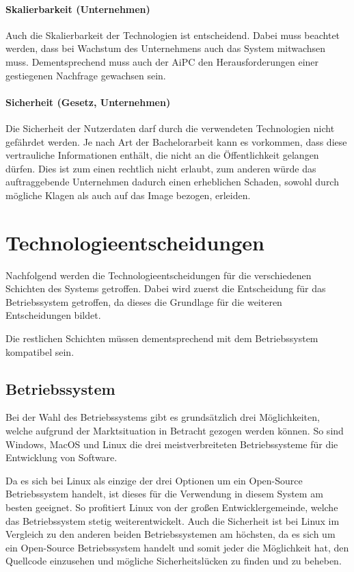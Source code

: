 \paragraph{Skalierbarkeit (Unternehmen)}\label{par:skalierbarkeit}
Auch die Skalierbarkeit der Technologien ist entscheidend.
Dabei muss beachtet werden, dass bei Wachstum des Unternehmens auch das System mitwachsen muss.
Dementsprechend muss auch der \ac{AiPC} den
Herausforderungen einer gestiegenen Nachfrage gewachsen sein.

\paragraph{Sicherheit (Gesetz, Unternehmen)}\label{par:sicherheit}
Die Sicherheit der Nutzerdaten darf durch die verwendeten Technologien nicht gefährdet werden.
Je nach Art der Bachelorarbeit kann es vorkommen, dass diese vertrauliche Informationen enthält,
die nicht an die Öffentlichkeit gelangen dürfen.
Dies ist zum einen rechtlich nicht erlaubt, zum anderen würde das auftraggebende Unternehmen
dadurch einen erheblichen Schaden, sowohl durch mögliche Klagen als auch auf das Image bezogen, erleiden.


\section{Technologieentscheidungen}\label{sec:technologieentscheidungen}
Nachfolgend werden die Technologieentscheidungen für die verschiedenen Schichten des Systems getroffen.
Dabei wird zuerst die Entscheidung für das Betriebssystem getroffen,
da dieses die Grundlage für die weiteren Entscheidungen bildet.

Die restlichen Schichten müssen dementsprechend mit dem Betriebssystem kompatibel sein.

\subsection{Betriebssystem}\label{subsec:betriebssystem}
Bei der Wahl des Betriebssystems gibt es grundsätzlich drei Möglichkeiten,
welche aufgrund der Marktsituation in Betracht gezogen werden können.
So sind Windows, MacOS und Linux die drei meistverbreiteten Betriebssysteme für die Entwicklung von Software\autocite{JetBrains-2023}.

Da es sich bei Linux als einzige der drei Optionen um ein Open-Source Betriebssystem handelt,
ist dieses für die Verwendung in diesem System am besten geeignet.
So profitiert Linux von der großen Entwicklergemeinde, welche das Betriebssystem stetig weiterentwickelt.
Auch die Sicherheit ist bei Linux im Vergleich zu den anderen beiden Betriebssystemen am höchsten,
da es sich um ein Open-Source Betriebssystem handelt und somit jeder die Möglichkeit hat,
den Quellcode einzusehen und mögliche Sicherheitslücken zu finden und zu beheben.

